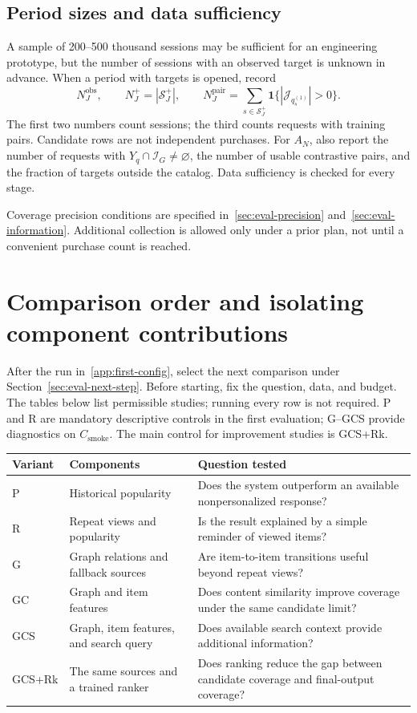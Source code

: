 \documentclass[12pt,a4paper]{article}
\newcommand{\ind}{\mathbf 1}
\theoremstyle{plainru}
\begin{document}
\subsection{Period sizes and data sufficiency}

A sample of 200--500 thousand sessions may be sufficient for an engineering
prototype, but the number of sessions with an observed target is unknown in advance.
When a period with targets is opened, record
\begin{equation}\label{eq:app-positive-counts}
N_J^{\mathrm{obs}},\qquad N_J^+=|\mathcal S_J^+|,\qquad
N_J^{\mathrm{pair}}=\sum_{s\in\mathcal S_J^+}\ind\{|\mathcal J_{q_s^{(1)}}|>0\}.
\end{equation}
The first two numbers count sessions; the third counts requests with training
pairs. Candidate rows are not independent purchases.
For $A_N$, also report the number of requests with $Y_q\cap\mathcal I_G\ne\varnothing$,
the number of usable contrastive pairs, and the fraction of targets outside the catalog.
Data sufficiency is checked for every stage.

Coverage precision conditions are specified
in~\ref{sec:eval-precision} and~\ref{sec:eval-information}.
Additional collection is allowed only under a prior plan,
not until a convenient purchase count is reached.

\clearpage
\section{Comparison order and isolating component contributions}\label{app:ablation}

After the run in~\ref{app:first-config}, select the next comparison
under Section~\ref{sec:eval-next-step}. Before starting, fix the question,
data, and budget. The tables below list permissible studies;
running every row is not required. P and R are mandatory descriptive
controls in the first evaluation; G--GCS provide diagnostics on $C_{\mathrm{smoke}}$.
The main control for improvement studies is GCS+Rk.

\begin{longtable}{L{0.12\textwidth}L{0.40\textwidth}L{0.38\textwidth}}
\toprule Variant & Components & Question tested \\\midrule\endhead
P & Historical popularity & Does the system outperform an available
nonpersonalized response? \\
R & Repeat views and popularity & Is the result explained
by a simple reminder of viewed items? \\
G & Graph relations and fallback sources & Are item-to-item transitions
useful beyond repeat views? \\
GC & Graph and item features & Does content similarity improve coverage
under the same candidate limit? \\
GCS & Graph, item features, and search query & Does available search
context provide additional information? \\
GCS+Rk & The same sources and a trained ranker & Does ranking
reduce the gap between candidate coverage and final-output coverage? \\
\bottomrule
\end{longtable}
\end{document}
